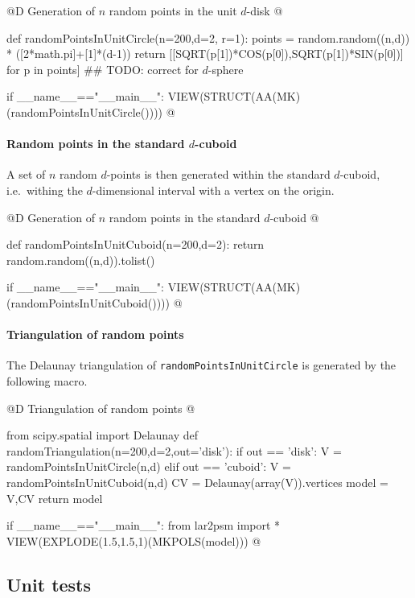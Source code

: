 \documentclass[11pt,oneside]{article}	%
\begin{document}
@D Generation of $n$ random points in the unit $d$-disk 
@{def randomPointsInUnitCircle(n=200,d=2, r=1):
	points = random.random((n,d)) * ([2*math.pi]+[1]*(d-1))
	return [[SQRT(p[1])*COS(p[0]),SQRT(p[1])*SIN(p[0])] for p in points]
	## TODO: correct for $d$-sphere

if __name__=="__main__":
	VIEW(STRUCT(AA(MK)(randomPointsInUnitCircle()))) 
@}

\paragraph{Random points in the standard $d$-cuboid} 
A set of $n$ random $d$-points is then generated within the standard $d$-cuboid, i.e.~withing the $d$-dimensional interval with a vertex on the origin.

@D Generation of $n$ random points in the standard $d$-cuboid 
@{def randomPointsInUnitCuboid(n=200,d=2):
	return random.random((n,d)).tolist()

if __name__=="__main__":
	VIEW(STRUCT(AA(MK)(randomPointsInUnitCuboid()))) 
@}



\paragraph{Triangulation of random points} The Delaunay triangulation of \texttt{randomPointsInUnitCircle} is generated by the following macro.


@D Triangulation of random points
@{from scipy.spatial import Delaunay
def randomTriangulation(n=200,d=2,out='disk'):
	if out == 'disk':
		V = randomPointsInUnitCircle(n,d)
	elif out == 'cuboid':
		V = randomPointsInUnitCuboid(n,d)
	CV = Delaunay(array(V)).vertices
	model = V,CV
	return model

if __name__=="__main__":
	from lar2psm import *
	VIEW(EXPLODE(1.5,1.5,1)(MKPOLS(model)))
@}
\subsection{Unit tests}
\end{document}
